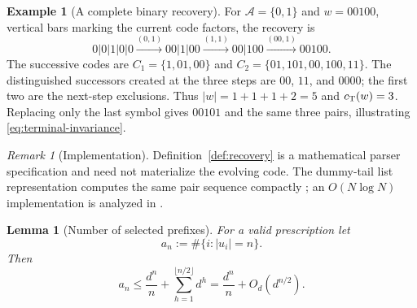 \documentclass[journal]{IEEEtran}
\theoremstyle{plain}
\newtheorem{lemma}[theorem]{Lemma}
\theoremstyle{definition}
\newtheorem{example}[theorem]{Example}
\theoremstyle{remark}
\newtheorem{remark}[theorem]{Remark}
\newcommand{\A}{\mathcal A}
\newcommand{\cT}{c_{\rm T}}
\begin{document}
\begin{example}[A complete binary recovery]\label{ex:recovery}
For $\A=\{0,1\}$ and $w=00100$, vertical bars marking the current code factors, the recovery is
\begin{equation*}
 0|0|1|0|0
 \xrightarrow{(0,1)}00|1|00
 \xrightarrow{(1,1)}00|100
 \xrightarrow{(00,1)}00100.
\end{equation*}
The successive codes are $C_1=\{1,01,00\}$ and $C_2=\{01,101,00,100,11\}$.  The distinguished successors created at the three steps are $00$, $11$, and $0000$; the first two are the next-step exclusions.  Thus $|w|=1+1+1+2=5$ and $\cT(w)=3$.  Replacing only the last symbol gives $00101$ and the same three pairs, illustrating \eqref{eq:terminal-invariance}.
\end{example}

\begin{remark}[Implementation]\label{rem:implementation}
Definition~\ref{def:recovery} is a mathematical parser specification and need not materialize the evolving code.  The dummy-tail list representation computes the same pair sequence compactly \cite[Secs.~1.1--2]{YangSpeidel2005Jucs}; an $O(N\log N)$ implementation is analyzed in \cite[Secs.~IV--V]{YangSpeidel2005}.
\end{remark}

\begin{lemma}[Number of selected prefixes]\label{lem:prefix-count}
For a valid prescription let
\begin{equation*}
 a_n:=\#\{i:|u_i|=n\}.
\end{equation*}
Then
\begin{equation}\label{eq:prefix-count}
 a_n\le \frac{d^n}{n}+\sum_{h=1}^{\lfloor n/2\rfloor}d^h
 =\frac{d^n}{n}+O_d(d^{n/2}).
\end{equation}
\end{lemma}
\end{document}
